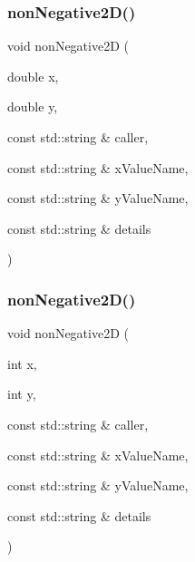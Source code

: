 \mbox{\label{namespacerequire_a2214293651f178b5b1f1a286537328bf}} 
\subsubsection{\texorpdfstring{non\+Negative2\+D()}{nonNegative2D()}\hspace{0.1cm}{\footnotesize\ttfamily [1/2]}}
{\footnotesize\ttfamily void non\+Negative2D (\begin{DoxyParamCaption}\item[{double}]{x,  }\item[{double}]{y,  }\item[{const std\+::string \&}]{caller,  }\item[{const std\+::string \&}]{x\+Value\+Name,  }\item[{const std\+::string \&}]{y\+Value\+Name,  }\item[{const std\+::string \&}]{details }\end{DoxyParamCaption})}

\mbox{\label{namespacerequire_ad0791f9f281c785969854c26f3506ac4}} 
\subsubsection{\texorpdfstring{non\+Negative2\+D()}{nonNegative2D()}\hspace{0.1cm}{\footnotesize\ttfamily [2/2]}}
{\footnotesize\ttfamily void non\+Negative2D (\begin{DoxyParamCaption}\item[{int}]{x,  }\item[{int}]{y,  }\item[{const std\+::string \&}]{caller,  }\item[{const std\+::string \&}]{x\+Value\+Name,  }\item[{const std\+::string \&}]{y\+Value\+Name,  }\item[{const std\+::string \&}]{details }\end{DoxyParamCaption})}

\mbox{\label{namespacerequire_a3be177878a4f956f7130efa7fe161309}} 
